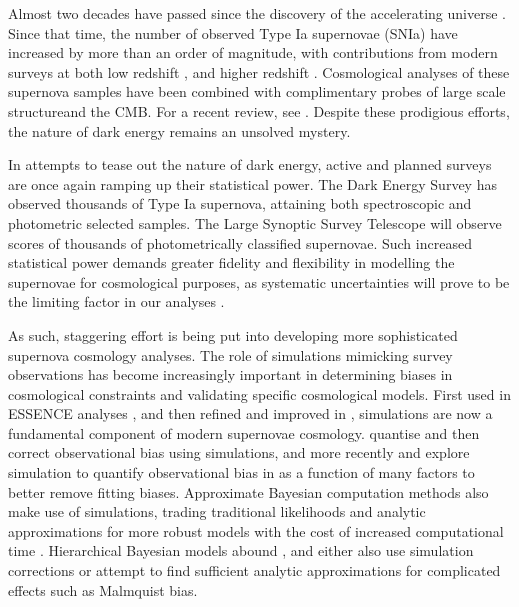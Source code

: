 \documentclass[a4paper,fleqn,usenatbib]{mnras}
\begin{document}
Almost two decades have passed since the discovery of the accelerating universe \citep{Riess1998, Perlmutter1999}. Since that time, the number of observed Type Ia supernovae (SNIa) have increased by more than an order of magnitude, with contributions from modern surveys at both low redshift \citep{Bailey2008, Freedman2009, Hicken2009,  Contreras2010, Conley2011}, and higher redshift \citep{Astier2006, Wood-Vasey2007, Frieman2008, Balland2009, Amanullah2010, Sako2014}. Cosmological analyses of these supernova samples \citep{Kowalski2008, Kessler2009, Conley2011, Suzuki2012, Betoule2014, Rest2014, Scolnic2017} have been combined with complimentary probes of large scale structureand the CMB. For a recent review, see \citet{Huterer2018}. Despite these prodigious efforts, the nature of dark energy remains an unsolved mystery.


In attempts to tease out the nature of dark energy, active and planned surveys are once again ramping up their statistical power. The Dark Energy Survey \citep[DES,][]{Bernstein2012, Abbott2016} has observed thousands of Type Ia supernova, attaining both spectroscopic and photometric selected samples. The Large Synoptic Survey Telescope \citep[LSST,][]{Ivezic2008, LSSTScienceCollaboration2009} will observe scores of thousands of photometrically classified supernovae. Such increased statistical power demands greater fidelity and flexibility in modelling the supernovae for cosmological purposes, as systematic uncertainties will prove to be the limiting factor in our analyses \citep{Betoule2014, Scolnic2017}.


As such, staggering effort is being put into developing more sophisticated supernova cosmology analyses. The role of simulations mimicking survey observations has become increasingly important in determining biases in cosmological constraints and validating specific cosmological models. First used in ESSENCE analyses \citep{Wood-Vasey2007}, and then refined and improved in \citet{Kessler2009}, simulations are now a fundamental component of modern supernovae cosmology.  \citet{Betoule2014} quantise and then correct observational bias using simulations, and more recently \citet{Scolnic2016} and \citet{Kessler2017} explore simulation to quantify observational bias in as a function of many factors to better remove fitting biases. Approximate Bayesian computation methods also make use of simulations, trading traditional likelihoods and analytic approximations for more robust models with the cost of increased computational time \citep{Weyant2013, Jennings2016}. Hierarchical Bayesian models abound \citep{Mandel2009, March2011, March2014, Rubin2015, Shariff2016, Roberts2017}, and either also use simulation corrections or attempt to find sufficient analytic approximations for complicated effects such as Malmquist bias.
\end{document}
